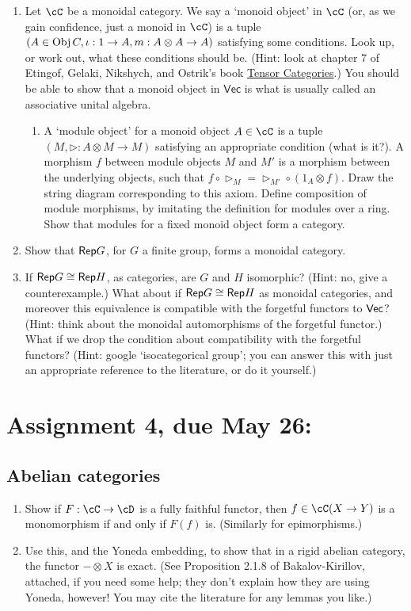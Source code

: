 \documentclass[12pt]{amsart}
\begin{document}
\begin{enumerate}
\item Let $\cC$ be a monoidal category. We say a `monoid object' in $\cC$ (or, as we gain confidence, just a monoid in $\cC$) is a tuple $(A \in \Obj C, \iota: 1 \to A, m: A \otimes A \to A)$ satisfying some conditions. Look up, or work out, what these conditions should be. (Hint: look at chapter 7 of Etingof, Gelaki, Nikshych, and Ostrik's book \href{http://www-math.mit.edu/~etingof/egnobookfinal.pdf}{Tensor Categories}.) You should be able to show that a monoid object in $\mathsf{Vec}$ is what is usually called an associative unital algebra.
\begin{enumerate}
\item A `module object' for a monoid object $A \in \cC$ is a tuple $(M, \triangleright: A \otimes M \to M)$ satisfying an appropriate condition (what is it?). A morphism $f$ between module objects $M$ and $M'$ is a morphism between the underlying objects, such that $f \circ \triangleright_M = \triangleright_{M'} \circ (1_A \otimes f)$. Draw the string diagram corresponding to this axiom. Define composition of module morphisms, by imitating the definition for modules over a ring. Show that modules for a fixed monoid object form a category.
\end{enumerate}
\item Show that $\Rep G$, for $G$ a finite group, forms a monoidal category.
\item If $\Rep G \cong \Rep H$, as categories, are $G$ and $H$ isomorphic? (Hint: no, give a counterexample.) What about if $\Rep G \cong \Rep H$ as monoidal categories, and moreover this equivalence is compatible with the forgetful functors to $\Vec$? (Hint: think about the monoidal automorphisms of the forgetful functor.) What if we drop the condition about compatibility with the forgetful functors? (Hint: google `isocategorical group'; you can answer this with just an appropriate reference to the literature, or do it yourself.)
\end{enumerate}

\newpage
\section{Assignment 4, due May 26:}
\subsection{Abelian categories}
\begin{enumerate}
\item Show if $F:\cC\to\cD$ is a fully faithful functor, then $f \in \cC(X \to Y)$ is a monomorphism if and only if $F(f)$ is. (Similarly for epimorphisms.)
\item Use this, and the Yoneda embedding, to show that in a rigid abelian category, the functor $- \otimes X$ is exact. (See Proposition 2.1.8 of Bakalov-Kirillov, attached, if you need some help; they don't explain how they are using Yoneda, however! You may cite the literature for any lemmas you like.)
\end{enumerate}
\end{document}
